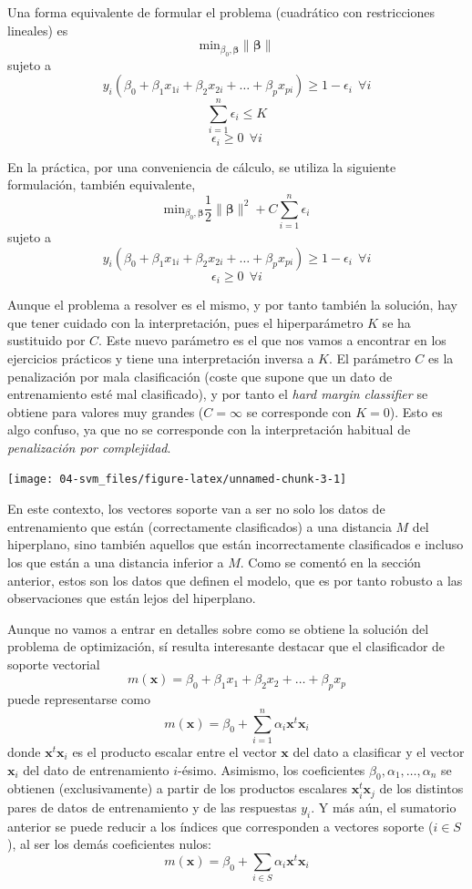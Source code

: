 \documentclass[
]{book}
\theoremstyle{break}
\theoremstyle{definition}
\theoremstyle{definition}
\theoremstyle{definition}
\theoremstyle{definition}
\theoremstyle{remark}
\begin{document}
Una forma equivalente de formular el problema (cuadrático con restricciones lineales) es
\[\mbox{min}_{\beta_0, \boldsymbol{\beta}} \lVert \boldsymbol{\beta} \rVert\]
sujeto a
\[ y_i(\beta_0 + \beta_1 x_{1i} + \beta_2 x_{2i} + \ldots + \beta_p x_{pi}) \ge 1 - \epsilon_i \ \ \forall i\]
\[\sum_{i=1}^n \epsilon_i \le K\]
\[\epsilon_i \ge 0 \ \ \forall i\]

En la práctica, por una conveniencia de cálculo, se utiliza la siguiente formulación, también equivalente,
\[\mbox{min}_{\beta_0, \boldsymbol{\beta}} \frac{1}{2}\lVert \boldsymbol{\beta} \rVert^2 + C \sum_{i=1}^n \epsilon_i\]
sujeto a
\[ y_i(\beta_0 + \beta_1 x_{1i} + \beta_2 x_{2i} + \ldots + \beta_p x_{pi}) \ge 1 - \epsilon_i \ \ \forall i\]
\[\epsilon_i \ge 0 \ \ \forall i\]

Aunque el problema a resolver es el mismo, y por tanto también la solución, hay que tener cuidado con la interpretación, pues el hiperparámetro \(K\) se ha sustituido por \(C\). Este nuevo parámetro es el que nos vamos a encontrar en los ejercicios prácticos y tiene una interpretación inversa a \(K\). El parámetro \(C\) es la penalización por mala clasificación (coste que supone que un dato de entrenamiento esté mal clasificado), y por tanto el \emph{hard margin classifier} se obtiene para valores muy grandes (\(C = \infty\) se corresponde con \(K = 0\)). Esto es algo confuso, ya que no se corresponde con la interpretación habitual de \emph{penalización por complejidad}.

\begin{center}\texttt{[image: 04-svm\_files/figure-latex/unnamed-chunk-3-1]} \end{center}

En este contexto, los vectores soporte van a ser no solo los datos de entrenamiento que están (correctamente clasificados) a una distancia \(M\) del hiperplano, sino también aquellos que están incorrectamente clasificados e incluso los que están a una distancia inferior a \(M\). Como se comentó en la sección anterior, estos son los datos que definen el modelo, que es por tanto robusto a las observaciones que están lejos del hiperplano.

Aunque no vamos a entrar en detalles sobre como se obtiene la solución del problema de optimización, sí resulta interesante destacar que el clasificador de soporte vectorial
\[m(\mathbf{x}) = \beta_0 + \beta_1 x_1 + \beta_2 x_2 + \ldots + \beta_p x_p\]
puede representarse como
\[m(\mathbf{x}) = \beta_0 + \sum_{i=1}^n \alpha_i \mathbf{x}^t \mathbf{x}_i\]
donde \(\mathbf{x}^t \mathbf{x}_i\) es el producto escalar entre el vector \(\mathbf{x}\) del dato a clasificar y el vector \(\mathbf{x}_i\) del dato de entrenamiento \(i\)-ésimo. Asimismo, los coeficientes \(\beta_0, \alpha_1, \ldots, \alpha_n\) se obtienen (exclusivamente) a partir de los productos escalares \(\mathbf{x}_i^t \mathbf{x}_j\) de los distintos pares de datos de entrenamiento y de las respuestas \(y_i\). Y más aún, el sumatorio anterior se puede reducir a los índices que corresponden a vectores soporte (\(i\in S\)), al ser los demás coeficientes nulos:
\[m(\mathbf{x}) = \beta_0 + \sum_{i\in S} \alpha_i \mathbf{x}^t \mathbf{x}_i\]
\end{document}

